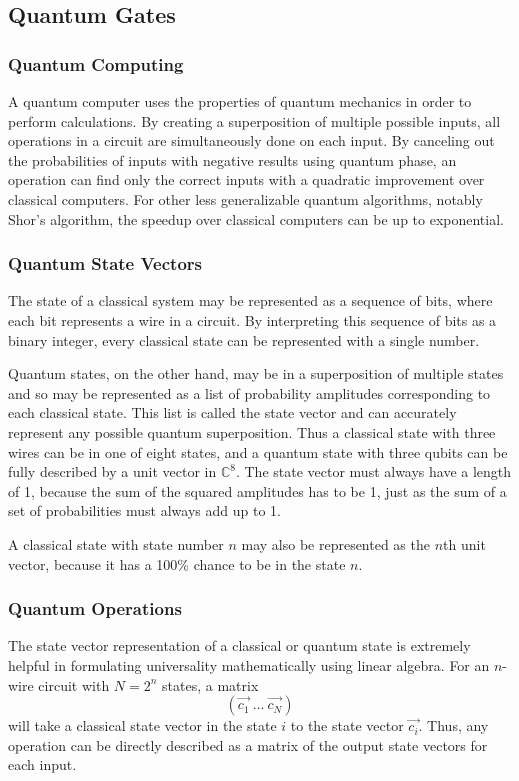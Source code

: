 \documentclass[12pt]{article}
\begin{document}
\subsection{Quantum Gates}
\subsubsection{Quantum Computing}
A quantum computer uses the properties of quantum mechanics in order to perform calculations. By creating a superposition of multiple possible inputs, all operations in a circuit are simultaneously done on each input. By canceling out the probabilities of inputs with negative results using quantum phase, an operation can find only the correct inputs with a quadratic improvement over classical computers. For other less generalizable quantum algorithms, notably Shor's algorithm, the speedup over classical computers can be up to exponential.

\subsubsection{Quantum State Vectors}
The state of a classical system may be represented as a sequence of bits, where each bit represents a wire in a circuit. By interpreting this sequence of bits as a binary integer, every classical state can be represented with a single number.

Quantum states, on the other hand, may be in a superposition of multiple states and so may be represented as a list of probability amplitudes corresponding to each classical state. This list is called the state vector and can accurately represent any possible quantum superposition. Thus a classical state with three wires can be in one of eight states, and a quantum state with three qubits can be fully described by a unit vector in $\mathbb{C}^8$. The state vector must always have a length of 1, because the sum of the squared amplitudes has to be 1, just as the sum of a set of probabilities must always add up to 1.

A classical state with state number $n$ may also be represented as the $n$th unit vector, because it has a 100\% chance to be in the state $n$.

\subsubsection{Quantum Operations}
The state vector representation of a classical or quantum state is extremely helpful in formulating universality mathematically using linear algebra. For an $n$-wire circuit with $N=2^n$ states, a matrix
$$
(\vec{c_{1}} \: \dots \: \vec{c_{N}})
$$
will take a classical state vector in the state $i$ to the state vector $\vec{c_{i}}$. Thus, any operation can be directly described as a matrix of the output state vectors for each input.
\end{document}
